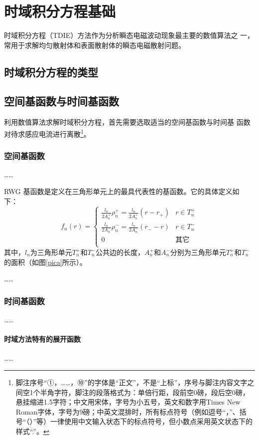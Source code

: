 
\chapter{时域积分方程基础}
时域积分方程（TDIE）方法作为分析瞬态电磁波动现象最主要的数值算法之
一，常用于求解均匀散射体和表面散射体的瞬态电磁散射问题。
\section{时域积分方程的类型}
\section{空间基函数与时间基函数}
利用数值算法求解时域积分方程，首先需要选取适当的空间基函数与时间基
函数对待求感应电流进行离散\footnote{脚注序号“①，……，⑩”的字体是“正文”，不是“上标”，序号与脚注内容文字之间空1个半角字符，脚注的段落格式为：单倍行距，段前空0磅，段后空0磅，悬挂缩进1.5字符；中文用宋体，字号为小五号，英文和数字用Times New Roman字体，字号为9磅；中英文混排时，所有标点符号（例如逗号“，”、括号“（）”等）一律使用中文输入状态下的标点符号，但小数点采用英文状态下的样式“.”。}。
\subsection{空间基函数}
……

RWG 基函数是定义在三角形单元上的最具代表性的基函数。它的具体定义如
下：
\begin{equation}
f_n(r)=
\begin{cases}
\frac{l_n}{2A_n^+}\rho_n^+=\frac{l_n}{2A_n^+}(r-r_+)&r\in T_n^+\\
\frac{l_n}{2A_n^-}\rho_n^-=\frac{l_n}{2A_n^-}(r_--r)&r\in T_n^-\\
0&\text{其它}\\
\end{cases}
\end{equation}
其中，$l_n$为三角形单元$T_n^+$和$T_n^-$公共边的长度，$A_n^+$和$A_n^-$分别为三角形单元$T_n^+$和$T_n^-$的面积（如图\ref{pica}所示）。

……

\subsection{时间基函数}
……
\subsubsection{时域方法特有的展开函数}
……
